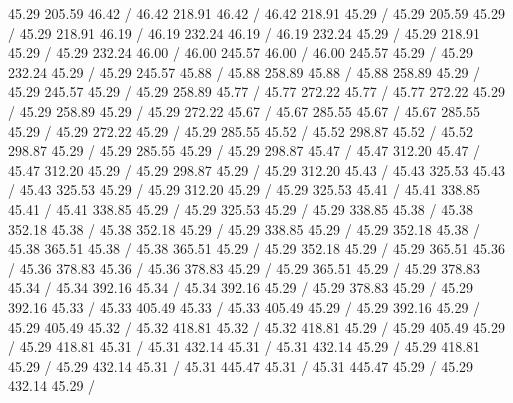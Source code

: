 \documentclass[12pt,a4paper]{report}
\begin{document}
{\setsolid
{} 45.29 205.59 46.42 /
 46.42 218.91 46.42 /
 46.42 218.91 45.29 /
 45.29 205.59 45.29 /
\setsolid
{} 45.29 218.91 46.19 /
 46.19 232.24 46.19 /
 46.19 232.24 45.29 /
 45.29 218.91 45.29 /
\setsolid
{} 45.29 232.24 46.00 /
 46.00 245.57 46.00 /
 46.00 245.57 45.29 /
 45.29 232.24 45.29 /
\setsolid
{} 45.29 245.57 45.88 /
 45.88 258.89 45.88 /
 45.88 258.89 45.29 /
 45.29 245.57 45.29 /
\setsolid
{} 45.29 258.89 45.77 /
 45.77 272.22 45.77 /
 45.77 272.22 45.29 /
 45.29 258.89 45.29 /
\setsolid
{} 45.29 272.22 45.67 /
 45.67 285.55 45.67 /
 45.67 285.55 45.29 /
 45.29 272.22 45.29 /
\setsolid
{} 45.29 285.55 45.52 /
 45.52 298.87 45.52 /
 45.52 298.87 45.29 /
 45.29 285.55 45.29 /
\setsolid
{} 45.29 298.87 45.47 /
 45.47 312.20 45.47 /
 45.47 312.20 45.29 /
 45.29 298.87 45.29 /
\setsolid
{} 45.29 312.20 45.43 /
 45.43 325.53 45.43 /
 45.43 325.53 45.29 /
 45.29 312.20 45.29 /
\setsolid
{} 45.29 325.53 45.41 /
 45.41 338.85 45.41 /
 45.41 338.85 45.29 /
 45.29 325.53 45.29 /
\setsolid
{} 45.29 338.85 45.38 /
 45.38 352.18 45.38 /
 45.38 352.18 45.29 /
 45.29 338.85 45.29 /
\setsolid
{} 45.29 352.18 45.38 /
 45.38 365.51 45.38 /
 45.38 365.51 45.29 /
 45.29 352.18 45.29 /
\setsolid
{} 45.29 365.51 45.36 /
 45.36 378.83 45.36 /
 45.36 378.83 45.29 /
 45.29 365.51 45.29 /
\setsolid
{} 45.29 378.83 45.34 /
 45.34 392.16 45.34 /
 45.34 392.16 45.29 /
 45.29 378.83 45.29 /
\setsolid
{} 45.29 392.16 45.33 /
 45.33 405.49 45.33 /
 45.33 405.49 45.29 /
 45.29 392.16 45.29 /
\setsolid
{} 45.29 405.49 45.32 /
 45.32 418.81 45.32 /
 45.32 418.81 45.29 /
 45.29 405.49 45.29 /
\setsolid
{} 45.29 418.81 45.31 /
 45.31 432.14 45.31 /
 45.31 432.14 45.29 /
 45.29 418.81 45.29 /
\setsolid
{} 45.29 432.14 45.31 /
 45.31 445.47 45.31 /
 45.31 445.47 45.29 /
 45.29 432.14 45.29 /
}
\end{document}
